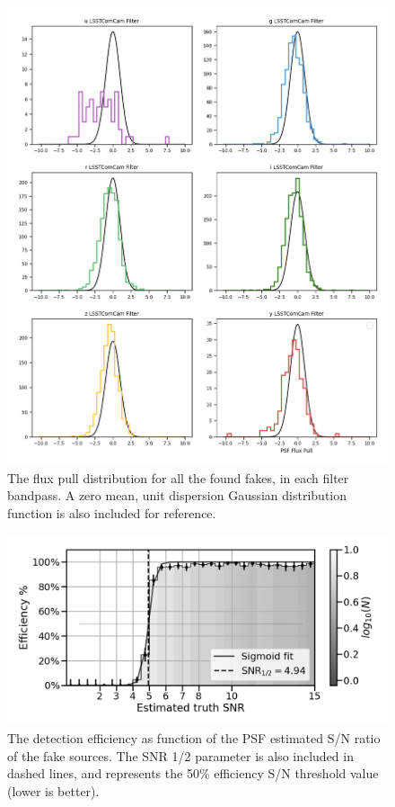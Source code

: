 \begin{figure}
    \centering
    \includegraphics[width=0.95\linewidth]{figures/flux_pulls.png}
    \caption{The flux pull distribution for all the found fakes, in each filter bandpass. A zero mean, unit dispersion Gaussian distribution function is also included for reference.}
    \label{fig:fake_sources_pulls}
\end{figure}


\begin{figure}
    \centering
    \includegraphics[width=0.95\linewidth]{figures/Efficiency_vs_forced_base_PsfFlux_instFlux_SNR.png}
    \caption{The detection efficiency as function of the PSF estimated S/N ratio of the fake sources. The SNR 1/2 parameter is also included in dashed lines, and represents the 50\% efficiency S/N threshold value (lower is better).}
    \label{fig:eff_vs_snr_fakes}
\end{figure}



